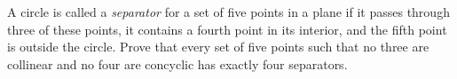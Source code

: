 A circle is called a \emph{separator} for a set of five points in a plane if it passes through three of these points, it contains a fourth point in its interior, and the fifth point is outside the circle. Prove that every set of five points such that no three are collinear and no four are concyclic has exactly four separators.

